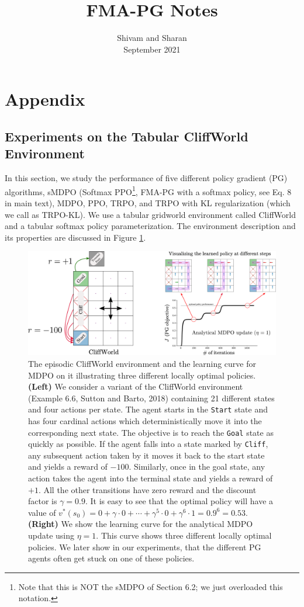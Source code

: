 \documentclass[a4paper, 10pt]{article}
\author{Shivam and Sharan
  \\ September 2021}
\date{}
\title{FMA-PG Notes}
\begin{document}
\maketitle
\vspace{-2cm}

\section{Appendix}
\subsection{Experiments on the Tabular CliffWorld Environment}
In this section, we study the performance of five different policy gradient (PG) algorithms, sMDPO (Softmax PPO\footnote{Note that this is NOT the sMDPO of Section 6.2; we just overloaded this notation.}, FMA-PG with a softmax policy, see Eq. 8 in main text), MDPO, PPO, TRPO, and TRPO with KL regularization (which we call as TRPO-KL). We use a tabular gridworld environment called CliffWorld and a tabular softmax policy parameterization. The environment description and its properties are discussed in Figure \ref{fig: cliffworld}.

\begin{figure}[!hbp]
  \centering
  \includegraphics[scale=0.36]{tabular_figures/cliffworld.pdf}
  \caption{The episodic CliffWorld environment and the learning curve for MDPO on it illustrating three different locally optimal policies. \textbf{(Left)} We consider a variant of the CliffWorld environment (Example 6.6, Sutton and Barto, 2018) containing 21 different states and four actions per state. The agent starts in the \texttt{Start} state and has four cardinal actions which deterministically move it into the corresponding next state. The objective is to reach the \texttt{Goal} state as quickly as possible. If the agent falls into a state marked by \texttt{Cliff}, any subsequent action taken by it moves it back to the start state and yields a reward of $-100$. Similarly, once in the goal state, any action takes the agent into the terminal state and yields a reward of $+1$. All the other transitions have zero reward and the discount factor is $\gamma = 0.9$. It is easy to see that the optimal policy will have a value of $v^*(s_0) = 0 + \gamma \cdot 0 + \cdots + \gamma^5 \cdot 0 + \gamma^6 \cdot 1 = 0.9^6 = 0.53$. \textbf{(Right)} We show the learning curve for the analytical MDPO update using $\eta = 1$. This curve shows three different locally optimal policies. We later show in our experiments, that the different PG agents often get stuck on one of these policies.}
  \label{fig: cliffworld}
\end{figure}
\end{document}
